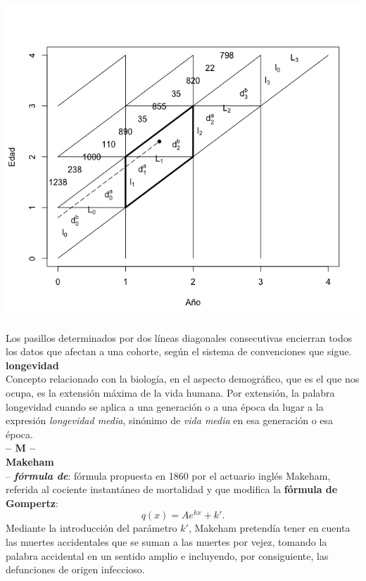 \begin{multicols}{2}
\hspace{-1cm}\includegraphics[scale=0.37]{Apendices/lexis.png}

Los pasillos determinados por dos l\'ineas diagonales consecutivas encierran todos los datos que afectan a una cohorte, seg\'un el sistema de convenciones que sigue.\\

\noindent \textbf{\Large{longevidad}}\\

\vspace{-0.3cm}
Concepto relacionado con la biolog\'ia, en el aspecto demogr\'afico, que es el que nos ocupa, es la extensi\'on m\'axima de la vida humana. Por extensi\'on, la palabra longevidad cuando se aplica a una generaci\'on o a una \'epoca da lugar a la expresi\'on \textit{longevidad media}, sin\'onimo de \textit{vida media} en esa generaci\'on o esa \'epoca.\\

\noindent\textbf{\huge{-- M --}}\\

\noindent \textbf{\Large{Makeham}}\\

\vspace{-0.3cm}
--  \textbf{\textit{fórmula de}}: fórmula propuesta en 1860 por el actuario inglés Makeham, referida al cociente instantáneo de mortalidad y que modifica la \textbf{fórmula de Gompertz}: $$q(x)=Ae^{kx}+k'.$$ Mediante la introducción del parámetro $k'$, Makeham pretendía tener en cuenta las muertes accidentales que se suman a las muertes por vejez, tomando la palabra accidental en un sentido amplio e incluyendo, por consiguiente, las defunciones de origen infeccioso.\\


\end{multicols}
